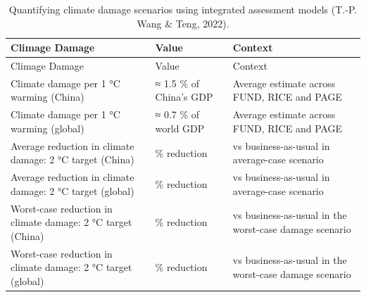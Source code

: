 \documentclass[
  12pt,
  letterpaper,
  DIV=11,
  numbers=noendperiod]{scrartcl}
\begin{document}
\begin{longtable}[]{@{}
  >{\raggedright\arraybackslash}p{}
  >{\raggedright\arraybackslash}p{}
  >{\raggedright\arraybackslash}p{}@{}}
\caption[Integrated Assessment Models: Quantifying Climate Damage
Scenarios]{Quantifying climate damage scenarios using integrated
assessment models (T.-P. Wang \& Teng, 2022).}\tabularnewline
\toprule\noalign{}
\begin{minipage}[b]{\linewidth}\raggedright
Climage Damage
\end{minipage} & \begin{minipage}[b]{\linewidth}\raggedright
Value
\end{minipage} & \begin{minipage}[b]{\linewidth}\raggedright
Context
\end{minipage} \\
\midrule\noalign{}
\endfirsthead
\toprule\noalign{}
\begin{minipage}[b]{\linewidth}\raggedright
Climage Damage
\end{minipage} & \begin{minipage}[b]{\linewidth}\raggedright
Value
\end{minipage} & \begin{minipage}[b]{\linewidth}\raggedright
Context
\end{minipage} \\
\midrule\noalign{}
\endhead
\bottomrule\noalign{}
\endlastfoot
Climate damage per 1 °C warming (China) & ≈ 1.5 \% of China's GDP &
Average estimate across FUND, RICE and PAGE \\
Climate damage per 1 °C warming (global) & ≈ 0.7 \% of world GDP &
Average estimate across FUND, RICE and PAGE \\
Average reduction in climate damage: 2 °C target (China) & 93 \%
reduction & vs business-as-usual in average-case scenario \\
Average reduction in climate damage: 2 °C target (global) & 87 \%
reduction & vs business-as-usual in average-case scenario \\
Worst-case reduction in climate damage: 2 °C target (China) & 80 \%
reduction & vs business-as-usual in the worst-case damage scenario \\
Worst-case reduction in climate damage: 2 °C target (global) & 84 \%
reduction & vs business-as-usual in the worst-case damage scenario \\
\end{longtable}
\end{document}
